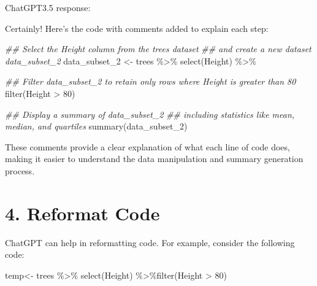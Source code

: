 \documentclass[
  letterpaper,
  DIV=11,
  numbers=noendperiod]{scrreprt}
\newenvironment{Shaded}{\begin{snugshade}}{\end{snugshade}}
\newcommand{\DecValTok}[1]{\textcolor[rgb]{0.68,0.00,0.00}{#1}}
\newcommand{\DocumentationTok}[1]{\textcolor[rgb]{0.37,0.37,0.37}{\textit{#1}}}
\newcommand{\FunctionTok}[1]{\textcolor[rgb]{0.28,0.35,0.67}{#1}}
\newcommand{\NormalTok}[1]{\textcolor[rgb]{0.00,0.23,0.31}{#1}}
\newcommand{\OtherTok}[1]{\textcolor[rgb]{0.00,0.23,0.31}{#1}}
\newcommand{\SpecialCharTok}[1]{\textcolor[rgb]{0.37,0.37,0.37}{#1}}
\begin{document}
ChatGPT3.5 response:

\label{chatgpt}
Certainly! Here's the code with comments added to explain each step:

\begin{Shaded}
\begin{Highlighting}[]
\DocumentationTok{\#\# Select the \textquotesingle{}Height\textquotesingle{} column from the \textquotesingle{}trees\textquotesingle{} dataset }
\DocumentationTok{\#\# and create a new dataset \textquotesingle{}data\_subset\_2\textquotesingle{}}
\NormalTok{data\_subset\_2 }\OtherTok{\textless{}{-}} 
\NormalTok{  trees }\SpecialCharTok{\%\textgreater{}\%}
  \FunctionTok{select}\NormalTok{(Height) }\SpecialCharTok{\%\textgreater{}\%}
  
\DocumentationTok{\#\# Filter \textquotesingle{}data\_subset\_2\textquotesingle{} to retain only rows where \textquotesingle{}Height\textquotesingle{} is greater than 80}
  \FunctionTok{filter}\NormalTok{(Height }\SpecialCharTok{\textgreater{}} \DecValTok{80}\NormalTok{)}

\DocumentationTok{\#\# Display a summary of \textquotesingle{}data\_subset\_2\textquotesingle{}}
\DocumentationTok{\#\# including statistics like mean, median, and quartiles}
\FunctionTok{summary}\NormalTok{(data\_subset\_2)}
\end{Highlighting}
\end{Shaded}

These comments provide a clear explanation of what each line of code
does, making it easier to understand the data manipulation and summary
generation process.

\section{4. Reformat Code}\label{reformat-code}

ChatGPT can help in reformatting code. For example, consider the
following code:

\begin{Shaded}
\begin{Highlighting}[]
\NormalTok{temp}\OtherTok{\textless{}{-}}\NormalTok{    trees }\SpecialCharTok{\%\textgreater{}\%} \FunctionTok{select}\NormalTok{(Height) }\SpecialCharTok{\%\textgreater{}\%}\FunctionTok{filter}\NormalTok{(Height }\SpecialCharTok{\textgreater{}} \DecValTok{80}\NormalTok{)}
\end{Highlighting}
\end{Shaded}
\end{document}
